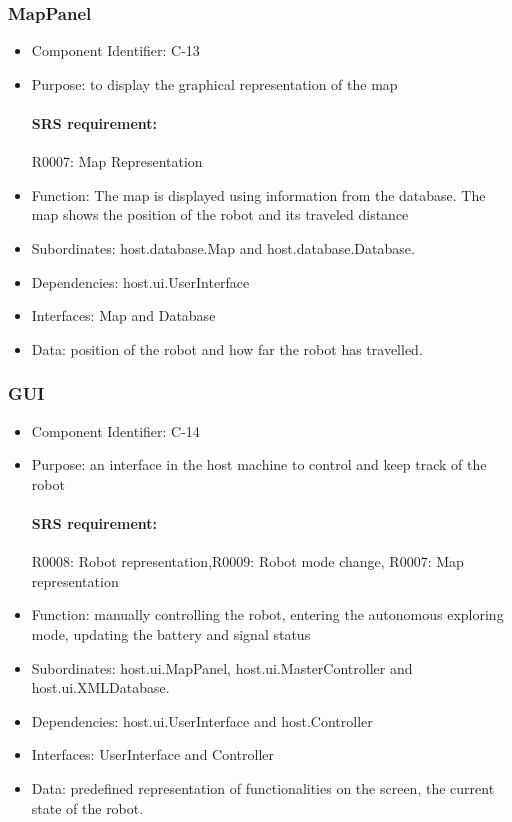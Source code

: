 \documentclass[11pt, a4paper]{report}
\begin{document}
\subsubsection{MapPanel}
\begin{itemize}
\item Component Identifier: C-13
\item Purpose: to display the graphical representation of the map
\paragraph{SRS requirement:} R0007: Map Representation
\item Function: The map is displayed using information from the database. The map shows
the position of the robot and its traveled distance
\item Subordinates: host.database.Map and host.database.Database.
\item Dependencies: host.ui.UserInterface
\item Interfaces: Map and Database
\item Data: position of the robot and how far the robot has travelled.
\end{itemize}
%

\subsubsection{GUI}
\begin{itemize}
\item Component Identifier: C-14
\item Purpose: an interface in the host machine to control and keep track of the robot
\paragraph{SRS requirement:} R0008: Robot representation,R0009: Robot mode change,
R0007: Map representation
\item Function: manually controlling the robot, entering the autonomous exploring mode, updating
the battery and signal status
\item Subordinates: host.ui.MapPanel, host.ui.MasterController and host.ui.XMLDatabase.
\item Dependencies: host.ui.UserInterface and host.Controller
\item Interfaces: UserInterface and Controller
\item Data: predefined representation of functionalities on the screen, the current state of the robot.
\end{itemize}
\end{document}
